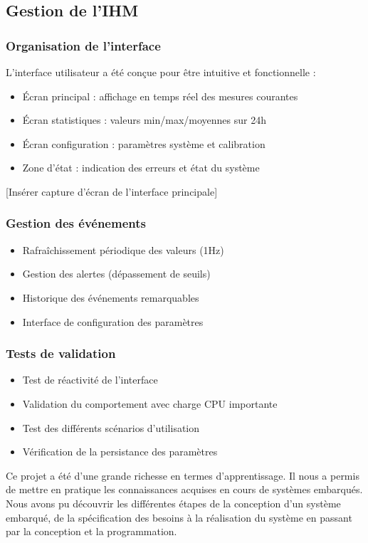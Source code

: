 \documentclass[12pt]{article}
\begin{document}
\subsection{Gestion de l'IHM}
\subsubsection{Organisation de l'interface}
L'interface utilisateur a été conçue pour être intuitive et fonctionnelle :
\begin{itemize}
    \item Écran principal : affichage en temps réel des mesures courantes
    \item Écran statistiques : valeurs min/max/moyennes sur 24h
    \item Écran configuration : paramètres système et calibration
    \item Zone d'état : indication des erreurs et état du système
\end{itemize}

[Insérer capture d'écran de l'interface principale]

\subsubsection{Gestion des événements}
\begin{itemize}
    \item Rafraîchissement périodique des valeurs (1Hz)
    \item Gestion des alertes (dépassement de seuils)
    \item Historique des événements remarquables
    \item Interface de configuration des paramètres
\end{itemize}

\subsubsection{Tests de validation}
\begin{itemize}
    \item Test de réactivité de l'interface
    \item Validation du comportement avec charge CPU importante
    \item Test des différents scénarios d'utilisation
    \item Vérification de la persistance des paramètres
\end{itemize}


Ce projet a été d'une grande richesse en termes d'apprentissage. Il nous a permis de mettre en pratique les connaissances acquises en cours de systèmes embarqués. Nous avons pu découvrir les différentes étapes de la conception d'un système embarqué, de la spécification des besoins à la réalisation du système en passant par la conception et la programmation.
\end{document}
